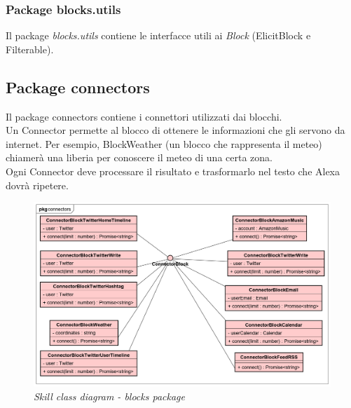 \subsubsection{Package blocks.utils}
Il package \textit{blocks.utils} contiene le interfacce utili ai \textit{Block} (ElicitBlock e Filterable).
\subsection{Package connectors}
Il package connectors contiene i connettori utilizzati dai blocchi.\\
Un Connector permette al blocco di ottenere le informazioni che gli servono da internet. Per esempio, BlockWeather (un blocco che rappresenta il meteo) chiamerà una liberia per conoscere il meteo di una certa zona.\\
Ogni Connector deve processare il risultato e trasformarlo nel testo che Alexa dovrà ripetere.
\begin{figure} [h]
    \centering
	\includegraphics[scale=0.3]{./images/ZeroSevenClassConnectors.png}
	\caption{\textit{Skill class diagram - blocks package}}\label{classlambda}
\end{figure}